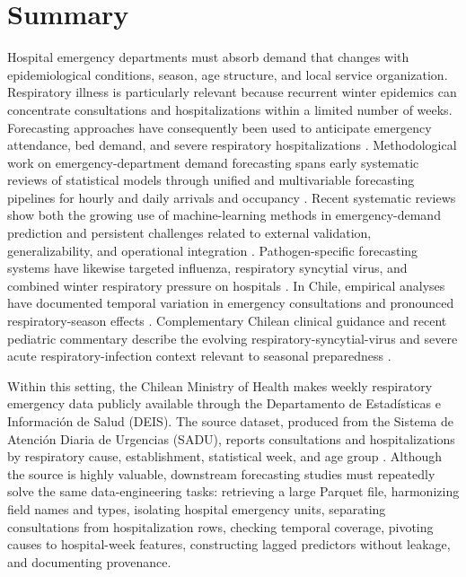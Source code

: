 \documentclass[data,datadescriptor,submit,moreauthors,pdftex]{Definitions/mdpi}
\begin{document}
\section{Summary}
\label{sec:summary}

Hospital emergency departments must absorb demand that changes with epidemiological conditions, season, age structure, and local service organization. Respiratory illness is particularly relevant because recurrent winter epidemics can concentrate consultations and hospitalizations within a limited number of weeks. Forecasting approaches have consequently been used to anticipate emergency attendance, bed demand, and severe respiratory hospitalizations \citep{Lucini2020,Duarte2021,Albrecht2024,Ackermann2025}. Methodological work on emergency-department demand forecasting spans early systematic reviews of statistical models \citep{Wargon2009} through unified and multivariable forecasting pipelines for hourly and daily arrivals and occupancy \citep{Vollmer2021,RostamiTabar2024,Tuominen2024IJF,PortoFogliatto2024,Alenezi2026}. Recent systematic reviews show both the growing use of machine-learning methods in emergency-demand prediction and persistent challenges related to external validation, generalizability, and operational integration \citep{Blanco2026,Hosseini2026}. Pathogen-specific forecasting systems have likewise targeted influenza, respiratory syncytial virus, and combined winter respiratory pressure on hospitals \citep{Mellor2023,Mellor2025,Cutrera2024,ChenXiao2024}. In Chile, empirical analyses have documented temporal variation in emergency consultations and pronounced respiratory-season effects \citep{ToroCastillo2024,DiazCarvajal2025}. Complementary Chilean clinical guidance and recent pediatric commentary describe the evolving respiratory-syncytial-virus and severe acute respiratory-infection context relevant to seasonal preparedness \citep{ZepedaF2024,DiazRubio2026}.

Within this setting, the Chilean Ministry of Health makes weekly respiratory emergency data publicly available through the Departamento de Estad\'isticas e Informaci\'on de Salud (DEIS). The source dataset, produced from the Sistema de Atenci\'on Diaria de Urgencias (SADU), reports consultations and hospitalizations by respiratory cause, establishment, statistical week, and age group \citep{DEIS2026}. Although the source is highly valuable, downstream forecasting studies must repeatedly solve the same data-engineering tasks: retrieving a large Parquet file, harmonizing field names and types, isolating hospital emergency units, separating consultations from hospitalization rows, checking temporal coverage, pivoting causes to hospital-week features, constructing lagged predictors without leakage, and documenting provenance.
\end{document}
